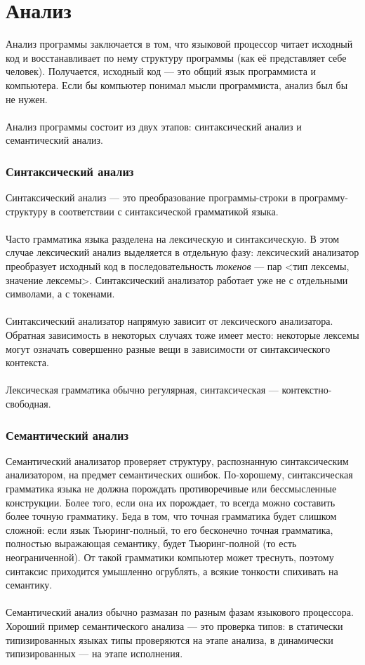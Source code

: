 \documentclass[11pt]{book}
\begin{document}
\section{Анализ}
Анализ программы заключается в том, что языковой процессор читает исходный код
и восстанавливает по нему структуру программы (как её представляет себе человек).
Получается, исходный код --- это общий язык программиста и компьютера.
Если бы компьютер понимал мысли программиста, анализ был бы не нужен.
\\ \\
Анализ программы состоит из двух этапов: синтаксический анализ и семантический анализ.

\subsubsection{Синтаксический анализ}
Синтаксический анализ --- это преобразование программы-строки в программу-структуру в соответствии с синтаксической грамматикой языка.
\\ \\
Часто грамматика языка разделена на лексическую и синтаксическую.
В этом случае лексический анализ выделяется в отдельную фазу:
лексический анализатор преобразует исходный код в последовательность \emph{токенов} --- пар <тип лексемы, значение лексемы>.
Синтаксический анализатор работает уже не с отдельными символами, а с токенами.
\\ \\
Синтаксический анализатор напрямую зависит от лексического анализатора.
Обратная зависимость в некоторых случаях тоже имеет место:
некоторые лексемы могут означать совершенно разные вещи в зависимости от синтаксического контекста.
\\ \\
Лексическая грамматика обычно регулярная, синтаксическая --- контекстно-свободная.

\subsubsection{Семантический анализ}
Семантический анализатор проверяет структуру, распознанную синтаксическим анализатором, на предмет семантических ошибок.
По-хорошему, синтаксическая грамматика языка не должна порождать противоречивые или бессмысленные конструкции.
Более того, если она их порождает, то всегда можно составить более точную грамматику.
Беда в том, что точная грамматика будет слишком сложной:
если язык Тьюринг-полный, то его бесконечно точная грамматика, полностью выражающая семантику, будет Тьюринг-полной (то есть неограниченной).
От такой грамматики компьютер может треснуть,
поэтому синтаксис приходится умышленно огрублять, а всякие тонкости спихивать на семантику.
\\ \\
Семантический анализ обычно размазан по разным фазам языкового процессора.
Хороший пример семантического анализа --- это проверка типов:
в статически типизированных языках типы проверяются на этапе анализа,
в динамически типизированных --- на этапе исполнения.
\end{document}
